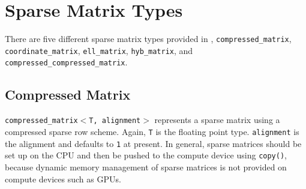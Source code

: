 \section{Sparse Matrix Types}

There are five different sparse matrix types provided in {\ViennaCL}, \lstinline|compressed_matrix|, \lstinline|coordinate_matrix|, \lstinline|ell_matrix|, \lstinline|hyb_matrix|, and \lstinline|compressed_compressed_matrix|.

\subsection{Compressed Matrix}
\texttt{compressed\_matrix$<$T, alignment$>$} represents a sparse
matrix using a compressed sparse row scheme. Again, \texttt{T} is the floating point type. \texttt{alignment} is the alignment and defaults to \texttt{1} at present.
In general, sparse matrices should be set up on the
CPU and then be pushed to the compute device using \texttt{copy()}, because dynamic memory management of sparse matrices is not provided on {\OpenCL} compute devices such as GPUs.

